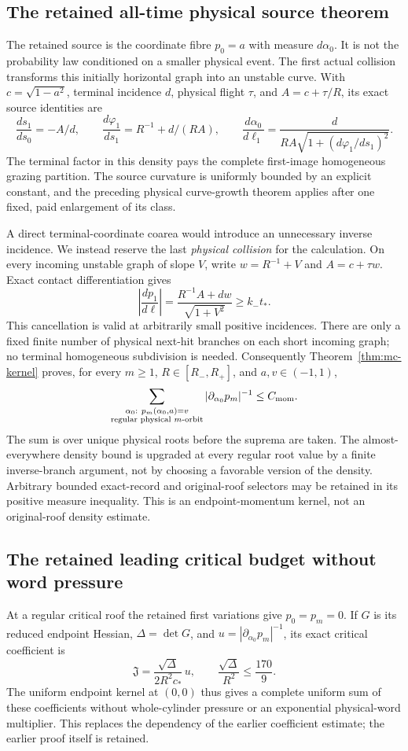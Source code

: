 \documentclass[11pt,reqno]{amsart}
\numberwithin{equation}{section}
\theoremstyle{definition}\newtheorem{definition}[theorem]{Definition}
\theoremstyle{remark}\newtheorem{remark}[theorem]{Remark}
\begin{document}
\subsection*{The retained all-time physical source theorem}
The retained source is the coordinate fibre $p_0=a$ with measure $d\alpha_0$.
It is not the probability law conditioned on a smaller physical event.
The first actual collision transforms this initially horizontal graph
into an unstable curve. With $c=\sqrt{1-a^2}$, terminal incidence $d$,
physical flight $\tau$, and $A=c+\tau/R$, its exact source identities are
\[
 \frac{ds_1}{ds_0}=-A/d,\qquad
 \frac{d\varphi_1}{ds_1}=R^{-1}+d/(RA),\qquad
 \frac{d\alpha_0}{d\ell_1}
     =\frac{d}{RA\sqrt{1+(d\varphi_1/ds_1)^2}}.
\]
The terminal factor in this density pays the complete first-image
homogeneous grazing partition. The source curvature is uniformly
bounded by an explicit constant, and the preceding physical curve-growth
theorem applies after one fixed, paid enlargement of its class.

A direct terminal-coordinate coarea would introduce an unnecessary
inverse incidence. We instead reserve the last \emph{physical collision}
for the calculation. On every incoming unstable graph of slope $V$,
write $w=R^{-1}+V$ and $A=c+\tau w$. Exact contact differentiation gives
\[
 \left|\frac{dp_1}{d\ell}\right|
       =\frac{R^{-1}A+dw}{\sqrt{1+V^2}}
       \ge k_-t_*.
\]
This cancellation is valid at arbitrarily small positive incidences.
There are only a fixed finite number of physical next-hit branches on
each short incoming graph; no terminal homogeneous subdivision is needed.
Consequently Theorem~\ref{thm:mc-kernel} proves, for every $m\ge1$,
$R\in[R_-,R_+]$, and $a,v\in(-1,1)$,
\[
 \sum_{\substack{\alpha_0:\ p_m(\alpha_0,a)=v\\
                         \text{regular physical }m\text{-orbit}}}
       |\partial_{\alpha_0}p_m|^{-1}\le C_{\rm mom}.
\]
The sum is over unique physical roots before the suprema are taken.
The almost-everywhere density bound is upgraded at every regular root
value by a finite inverse-branch argument, not by choosing a favorable
version of the density. Arbitrary bounded exact-record and original-roof
selectors may be retained in its positive measure inequality. This is
an endpoint-momentum kernel, not an original-roof density estimate.

\subsection*{The retained leading critical budget without word pressure}
At a regular critical roof the retained first variations give
$p_0=p_m=0$. If $G$ is its reduced endpoint Hessian, $\Delta=\det G$,
and $u=|\partial_{\alpha_0}p_m|^{-1}$, its exact critical coefficient is
\[
 \mathfrak J=\frac{\sqrt\Delta}{2R^2c_*}\,u,
 \qquad \frac{\sqrt\Delta}{R^2}\le\frac{170}{9}.
\]
The uniform endpoint kernel at $(0,0)$ thus gives a complete uniform
sum of these coefficients without whole-cylinder pressure or an
exponential physical-word multiplier. This replaces the dependency of
the earlier coefficient estimate; the earlier proof itself is retained.
\end{document}

